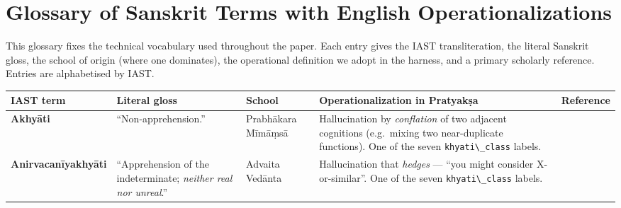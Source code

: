 \section{Glossary of Sanskrit Terms with English Operationalizations}\label{glossary-of-sanskrit-terms-with-english-operationalizations}

This glossary fixes the technical vocabulary used throughout the paper. Each entry gives the IAST transliteration, the literal Sanskrit gloss, the school of origin (where one dominates), the operational definition we adopt in the harness, and a primary scholarly reference. Entries are alphabetised by IAST.

{\def\LTcaptype{none} %
\begin{longtable}[]{@{}
  >{\raggedright\arraybackslash}p{}
  >{\raggedright\arraybackslash}p{}
  >{\raggedright\arraybackslash}p{}
  >{\raggedright\arraybackslash}p{}
  >{\raggedright\arraybackslash}p{}@{}}
\toprule\noalign{}
\begin{minipage}[b]{\linewidth}\raggedright
IAST term
\end{minipage} & \begin{minipage}[b]{\linewidth}\raggedright
Literal gloss
\end{minipage} & \begin{minipage}[b]{\linewidth}\raggedright
School
\end{minipage} & \begin{minipage}[b]{\linewidth}\raggedright
Operationalization in Pratyakṣa
\end{minipage} & \begin{minipage}[b]{\linewidth}\raggedright
Reference
\end{minipage} \\
\midrule\noalign{}
\endhead
\bottomrule\noalign{}
\endlastfoot
\textbf{Akhyāti} & ``Non-apprehension.'' & Prabhākara Mīmāṃsā & Hallucination by \emph{conflation} of two adjacent cognitions (e.g.~mixing two near-duplicate functions). One of the seven \passthrough{\lstinline!khyati\_class!} labels. & \citep{bhatt1989prabhakara, datta1932advaita} \\
\textbf{Anirvacanīyakhyāti} & ``Apprehension of the indeterminate; \emph{neither real nor unreal}.'' & Advaita Vedānta & Hallucination that \emph{hedges} --- ``you might consider X-or-similar''. One of the seven \passthrough{\lstinline!khyati\_class!} labels. & \citep{ram2007error, deutsch1969advaita} \\

\end{longtable}}
